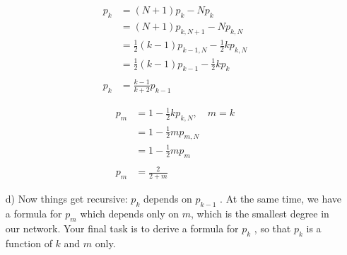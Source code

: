 \documentclass[a4paper,12pt]{article}
\begin{document}
\begin{itemize}
\begin{minipage}{0.5\linewidth}
\centering
\begin{equation*}
  \begin{split}
    p_k & = (N+1)p_{k} - Np_{k}\\
    & = (N+1)p_{k,N+1} - Np_{k,N}\\
    & = \frac{1}{2}(k-1)p_{k-1,N} - \frac{1}{2}kp_{k,N}\\
    & = \frac{1}{2}(k-1)p_{k-1} - \frac{1}{2}kp_{k}\\
    \\
    p_k & = \frac{k-1}{k+2}p_{k-1}
  \end{split}
  \end{equation*}
\end{minipage}\hfill
\begin{minipage}{0.5\linewidth}
\centering
\begin{equation*}
  \begin{split}
    p_m & = 1 - \frac{1}{2}kp_{k,N}, \quad m =k\\
    & = 1 - \frac{1}{2}mp_{m,N}\\
    & = 1 - \frac{1}{2}mp_{m}\\
    \\
    p_m & = \frac{2}{2+m}
  \end{split}
  \end{equation*}
\end{minipage}


\item[d) ] Now things get recursive: $p_k$ depends on $p_{k−1}$ . At the same
time, we have a formula for $p_m$ which depends only on $m$, which is the smallest degree in
our network. Your final task is to derive a formula for $p_k$ , so that $p_k$ is a function of $k$ and $m$ only.

\end{itemize}
\end{document}
